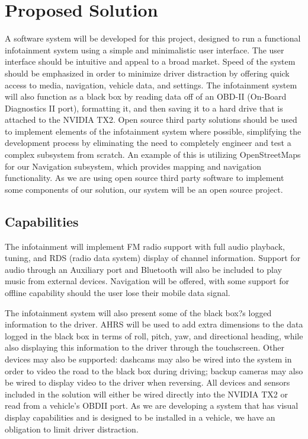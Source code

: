 \documentclass[onecolumn, draftclsnofoot,10pt, compsoc]{IEEEtran}
\begin{document}
\section{Proposed Solution}
A software system will be developed for this project, designed to run a functional infotainment system using a simple and minimalistic user interface. The user interface should be intuitive and appeal to a broad market. Speed of the system should be emphasized in order to minimize driver distraction by offering quick access to media, navigation, vehicle data, and settings. The infotainment system will also function as a black box by reading data off of an OBD-II (On-Board Diagnostics II port), formatting it, and then saving it to a hard drive that is attached to the NVIDIA TX2. Open source third party solutions should be used to implement elements of the infotainment system where possible, simplifying the development process by eliminating the need to completely engineer and test a complex subsystem from scratch. An example of this is utilizing OpenStreetMaps for our Navigation subsystem, which provides mapping and navigation functionality. As we are using open source third party software to implement some components of our solution, our system will be an open source project.\par

\subsection{Capabilities}
The infotainment will implement FM radio support with full audio playback, tuning, and RDS (radio data system) display of channel information. Support for audio through an Auxiliary port and Bluetooth will also be included to play music from external devices. Navigation will be offered, with some support for offline capability should the user lose their mobile data signal.\par

The infotainment system will also present some of the black box?s logged information to the driver. AHRS will be used to add extra dimensions to the data logged in the black box in terms of roll, pitch, yaw, and directional heading, while also displaying this information to the driver through the touchscreen. Other devices may also be supported: dashcams may also be wired into the system in order to video the road to the black box during driving; backup cameras may also be wired to display video to the driver when reversing. All devices and sensors included in the solution will either be wired directly into the NVIDIA TX2 or read from a vehicle's OBDII port. As we are developing a system that has visual display capabilities and is designed to be installed in a vehicle, we have an obligation to limit driver distraction.\par
\end{document}

